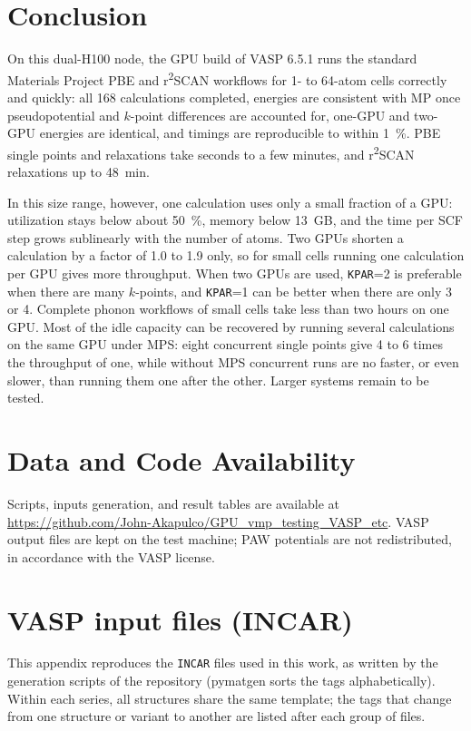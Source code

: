 \documentclass[11pt,letterpaper]{article}
\begin{document}
\section{Conclusion}
\label{sec:conclusion}
On this dual-H100 node, the GPU build of VASP 6.5.1 runs the standard Materials Project PBE and
r\textsuperscript{2}SCAN workflows for 1- to 64-atom cells correctly and quickly: all 168
calculations completed, energies are consistent with MP once pseudopotential and $k$-point
differences are accounted for, one-GPU and two-GPU energies are identical, and timings are
reproducible to within \SI{1}{\percent}. PBE single points and relaxations take seconds to a
few minutes, and r\textsuperscript{2}SCAN relaxations up to \SI{48}{min}.

In this size range, however, one calculation uses only a small fraction of a GPU: utilization
stays below about \SI{50}{\percent}, memory below \SI{13}{GB}, and the time per SCF step grows
sublinearly with the number of atoms. Two GPUs shorten a calculation by a factor of 1.0 to
1.9 only, so for small cells running one calculation per GPU gives more throughput. When two
GPUs are used, \texttt{KPAR}=2 is preferable when there are many $k$-points, and
\texttt{KPAR}=1 can be better when there are only 3 or 4. Complete phonon workflows of small
cells take less than two hours on one GPU. Most of the idle capacity can be recovered by running
several calculations on the same GPU under MPS: eight concurrent single points give 4 to 6 times
the throughput of one, while without MPS concurrent runs are no faster, or even slower, than
running them one after the other. Larger systems remain to be tested.

\section*{Data and Code Availability}
Scripts, inputs generation, and result tables are available at
\url{https://github.com/John-Akapulco/GPU_vmp_testing_VASP_etc}. VASP output files are kept on
the test machine; PAW potentials are not redistributed, in accordance with the VASP license.

\clearpage
\appendix
\section{VASP input files (INCAR)}
\label{app:incar}
This appendix reproduces the \texttt{INCAR} files used in this work, as written by the
generation scripts of the repository (pymatgen sorts the tags alphabetically). Within each
series, all structures share the same template; the tags that change from one structure or
variant to another are listed after each group of files.
\end{document}
